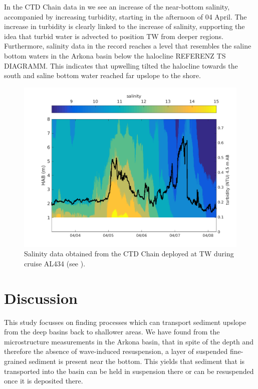  In the CTD Chain data in  we see an increase of the 
near-bottom salinity, accompanied by increasing turbidity, starting in the 
afternoon of 04 April. The increase in turbidity is clearly linked to the 
increase of salinity, supporting the idea that turbid water is advected to 
position TW from deeper 
regions. Furthermore, salinity data in the record reaches a level that 
resembles the saline bottom waters in the Arkona basin below the 
halocline REFERENZ TS DIAGRAMM. This indicates that upwelling 
tilted the halocline towards the south and saline bottom water reached far 
upslope to the shore.

 \begin{figure}[ht]
\includegraphics[width=15cm]{bilder/ctdchaintw.png}
 \caption{Salinity data obtained from the CTD Chain deployed at TW 
during cruise AL434 (see ).}
 \label{ctdchain}
 \end{figure}

\FloatBarrier
\section{Discussion}

This study focusses on finding processes which can transport sediment upslope 
from the deep basins back to shallower areas. We have found from the 
microstructure measurements in the Arkona basin, that in spite of the depth and 
therefore the absence of wave-induced resuspension, a layer of 
suspended fine-grained sediment is present near the bottom. This yields that 
sediment that is transported into the basin can be held in suspension there 
or can be resuspended once it is deposited there.

